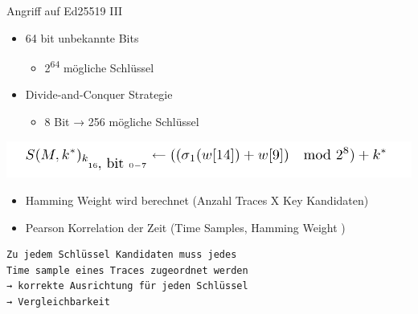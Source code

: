 \begin{frame}[fragile]{Angriff auf Ed25519 III}
\protect\hypertarget{angriff-auf-ed25519-iii}{}
\begin{itemize}
\tightlist
\item
  64 bit unbekannte Bits

  \begin{itemize}
  \tightlist
  \item
    2\textsuperscript{64} mögliche Schlüssel
  \end{itemize}
\end{itemize}

\pause

\begin{itemize}
\tightlist
\item
  Divide-and-Conquer Strategie

  \begin{itemize}
  \tightlist
  \item
    8 Bit → 256 mögliche Schlüssel
  \end{itemize}
\end{itemize}

\pause

\includegraphics[width=\textwidth,height=0.6\textheight]{Abbildungen/keyDPA.png}

\pause

\begin{itemize}
\tightlist
\item
  Hamming Weight wird berechnet (Anzahl Traces X Key Kandidaten)
\end{itemize}

\pause

\begin{itemize}
\tightlist
\item
  Pearson Korrelation der Zeit (Time Samples, Hamming Weight )
\end{itemize}

\begin{lstlisting}
Zu jedem Schlüssel Kandidaten muss jedes    
Time sample eines Traces zugeordnet werden    
→ korrekte Ausrichtung für jeden Schlüssel  
→ Vergleichbarkeit
\end{lstlisting}
\end{frame}

